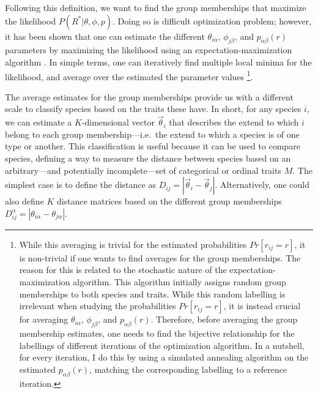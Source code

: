 \documentclass[11pt, a4paper]{article}
\begin{document}
Following this definition, we want to find the group memberships that maximize the likelihood $P\left(R^{*}|\theta, \phi, p\right)$. Doing so is difficult optimization problem; however, it has been shown that one can estimate the different $\theta_{i\alpha}$, $\phi_{j\beta}$, and $p_{\alpha\beta}\left(r\right)$ parameters by maximizing the likelihood using an expectation-maximization algorithm \citep{godoy-loriteAccurateScalableSocial2016, tarres-deulofeuTensorialBipartiteBlock2019}. In simple terms, one can iteratively find multiple local minima for the likelihood, and average over the estimated the parameter values \citep{godoy-loriteAccurateScalableSocial2016}\footnote[2]{
While this averaging is trivial for the estimated probabilities $Pr[r_{ij}=r]$, it is non-trivial if one wants to find averages for the group memberships. The reason for this is related to the stochastic nature of the expectation-maximization algorithm. This algorithm initially assigns random group memberships to both species and traits. While this random labelling is irrelevant when studying the probabilities $Pr[r_{ij}=r]$, it is instead crucial for averaging $\theta_{i\alpha}$, $\phi_{j\beta}$, and $p_{\alpha\beta}\left(r\right)$. Therefore, before averaging the group membership estimates, one needs to find the bijective relationship for the labellings of different iterations of the optimization algorithm. In a nutshell, for every iteration, I do this by using a simulated annealing algorithm on the estimated $p_{\alpha\beta}\left(r\right)$, matching the corresponding labelling to a reference iteration.}. 

The average estimates for the group memberships provide us with a different scale to classify species based on the traits these have. In short, for any species $i$, we can estimate a $K$-dimensional vector $\vec{\theta}_{i}$ that describes the extend to which $i$ belong to each group membership---i.e.~the extend to which a species is of one type or another. This classification is useful because it can be used to compare species, defining a way to measure the distance between species based on an arbitrary---and potentially incomplete---set of categorical or ordinal traits $M$. The simplest case is to define the distance as $D_{ij} = |\vec{\theta}_{i}-\vec{\theta}_{j}|$. Alternatively, one could also define $K$ distance matrices based on the different group memberships $D^{\alpha}_{ij} = |\theta_{i\alpha}-\theta_{j\alpha}|$.
\end{document}
